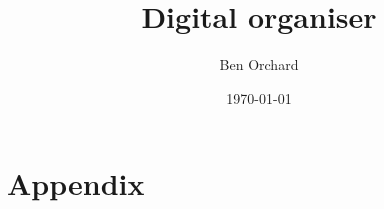 \newcommand{\addmylib}[1]{}
\newcommand{\addsrc}[1]{}

\addmylib{preamble}
\addmylib{annotate}
\addmylib{extra/tables}
\addmylib{extra/headers-footers}



\title{Digital organiser}
\author{Ben Orchard}

\date{\today}

\maketitle

\clearpage
\tableofcontents
\clearpage

\addsrc{analysis}
\clearpage
\addsrc{design}

\clearpage
\section{Appendix}
\addsrc{interview}


